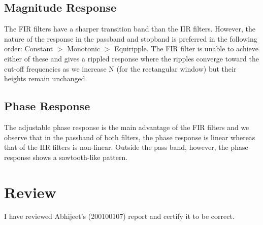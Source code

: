 \documentclass[12pt]{article}
\begin{document}
\subsection{Magnitude Response}
The FIR filters have a sharper transition band than the IIR filters. However, the nature of the response in the passband and stopband is preferred in the following order: Constant $>$ Monotonic $>$ Equiripple. The FIR filter is unable to achieve either of these and gives a rippled response where the ripples converge toward the cut-off frequencies as we increase N (for the rectangular window) but their heights remain unchanged.
\subsection{Phase Response}
The adjustable phase response is the main advantage of the FIR filters and we observe that in the passband of both filters, the phase response is linear whereas that of the IIR filters is non-linear. Outside the pass band, however, the phase response shows a sawtooth-like pattern.

\section{Review}
I have reviewed Abhijeet's (200100107) report and certify it to be correct.
\end{document}
